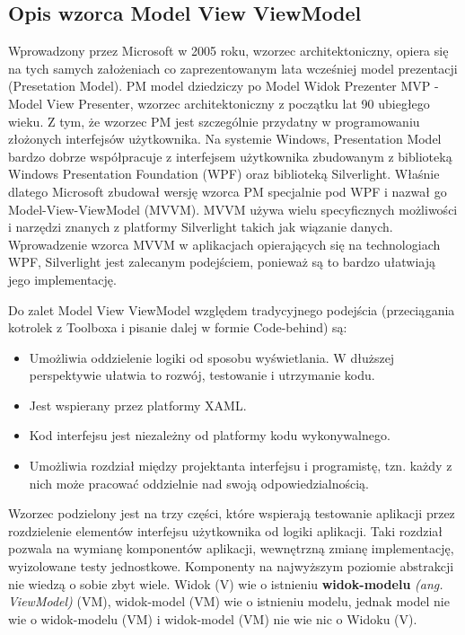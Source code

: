 \documentclass[a4paper,twoside,titlepage,openright]{book}
\begin{document}
\subsection{Opis wzorca Model View ViewModel}

Wprowadzony przez Microsoft w 2005 roku, wzorzec architektoniczny, opiera się na tych samych założeniach co zaprezentowanym lata wcześniej model prezentacji (Presetation Model). PM model dziedziczy po Model Widok Prezenter MVP - Model View Presenter, wzorzec architektoniczny z początku lat 90 ubiegłego wieku. Z tym, że wzorzec PM jest szczególnie przydatny w programowaniu złożonych interfejsów użytkownika. Na systemie Windows, Presentation Model bardzo dobrze współpracuje z interfejsem użytkownika zbudowanym z biblioteką Windows Presentation Foundation (WPF) oraz biblioteką Silverlight. Właśnie dlatego Microsoft zbudował wersję wzorca PM specjalnie pod WPF i nazwał go Model-View-ViewModel (MVVM). \cite{aspNet} MVVM używa wielu specyficznych możliwości i narzędzi znanych z platformy Silverlight takich jak wiązanie danych. Wprowadzenie wzorca MVVM w aplikacjach opierających się na technologiach WPF, Silverlight jest zalecanym podejściem, ponieważ są to bardzo ułatwiają jego implementację.

Do zalet Model View ViewModel względem tradycyjnego podejścia (przeciągania kotrolek z Toolboxa i pisanie dalej w formie Code-behind) są:

\begin{itemize}

	\item Umożliwia oddzielenie logiki od sposobu wyświetlania. W dłuższej perspektywie ułatwia to rozwój, testowanie i utrzymanie kodu.
	\item Jest wspierany przez platformy XAML.
	\item Kod interfejsu jest niezależny od platformy kodu wykonywalnego.
	\item Umożliwia rozdział między projektanta interfejsu i programistę, tzn. każdy z nich może pracować oddzielnie nad swoją odpowiedzialnością.
\end{itemize}

Wzorzec podzielony jest na trzy części, które wspierają testowanie aplikacji przez rozdzielenie elementów interfejsu użytkownika od logiki aplikacji. Taki rozdział pozwala na wymianę komponentów aplikacji, wewnętrzną zmianę implementację, wyizolowane testy jednostkowe. Komponenty na najwyższym poziomie abstrakcji nie wiedzą o sobie zbyt wiele. Widok (V) wie o istnieniu \textbf{widok-modelu} \textit{(ang. ViewModel)} (VM), widok-model (VM) wie o istnieniu modelu, jednak model nie wie o widok-modelu (VM) i widok-model (VM) nie wie nic o Widoku (V).
\end{document}
